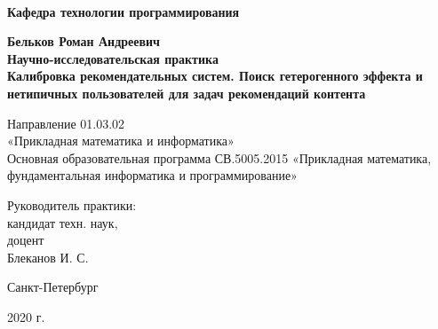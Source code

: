 
\begin{titlepage}
\begin{center}
\\
\textbf{Кафедра технологии программирования}

\vspace{32mm}

\textbf{\Large Бельков Роман Андреевич} \\[8mm]
\textbf{\large Научно-исследовательская практика}\\[18mm]
\textbf{\Large Калибровка рекомендательных систем. Поиск гетерогенного эффекта и нетипичных пользователей для задач рекомендаций контента}

\vspace{16mm}
Направление 01.03.02 \\«Прикладная математика и информатика»\\
Основная образовательная программа СВ.5005.2015
«Прикладная математика, фундаментальная информатика и программирование»\\

\vspace{26mm}

\begin{flushleft}
{\setlength{\leftskip}{22em}
 {Руководитель практики:} \\
 кандидат техн. наук, \\
 доцент \\ Блеканов И. С. \\
}
\end{flushleft}

\vfill

{Санкт-Петербург}
\par{2020 г.}
\end{center}
\end{titlepage}
\restoregeometry
\addtocounter{page}{1}